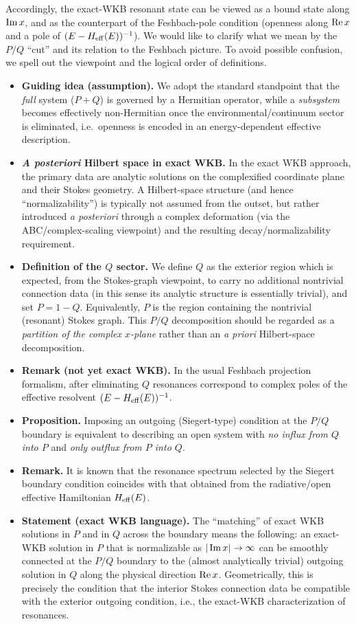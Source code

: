 Accordingly, the exact-WKB resonant state can be viewed as a bound state along $\operatorname{Im} x$, and as the counterpart of the Feshbach-pole condition (openness along $\operatorname{Re} x$ and a pole of $(E-H_{\mathrm{eff}}(E))^{-1}$).
%
We would like to clarify what we mean by the $P/Q$ ``cut'' and its relation to the Feshbach picture.
To avoid possible confusion, we spell out the viewpoint and the logical order of definitions.
\begin{itemize}
  \item \textbf{Guiding idea (assumption).}
  We adopt the standard standpoint that the \textit{full} system ($P+Q$) is governed by a Hermitian operator,
  while a \textit{subsystem} becomes effectively non-Hermitian once the environmental/continuum sector is eliminated,
  i.e.\ openness is encoded in an energy-dependent effective description.
  \item \textbf{\textit{A posteriori} Hilbert space in exact WKB.}
  In the exact WKB approach, the primary data are analytic solutions on the complexified coordinate plane and their Stokes geometry.
  A Hilbert-space structure (and hence ``normalizability'') is typically not assumed from the outset, but rather introduced \textit{a posteriori} through a complex deformation (via the ABC/complex-scaling viewpoint) and the resulting decay/normalizability requirement.
  \item \textbf{Definition of the $Q$ sector.}
  We define $Q$ as the exterior region which is expected, from the Stokes-graph viewpoint, to carry no additional nontrivial connection data (in this sense its analytic structure is essentially trivial), and set $P=1-Q$.
  Equivalently, $P$ is the region containing the nontrivial (resonant) Stokes graph.
  This $P/Q$ decomposition should be regarded as a \textit{partition of the complex $x$-plane} rather than an \textit{a priori} Hilbert-space decomposition.
  \item \textbf{Remark (not yet exact WKB).}
  In the usual Feshbach projection formalism, after eliminating $Q$ resonances correspond to complex poles of the effective resolvent $(E-H_{\mathrm{eff}}(E))^{-1}$.
  \item \textbf{Proposition.}
  Imposing an outgoing (Siegert-type) condition at the $P/Q$ boundary is equivalent to describing an open system with \textit{no influx from $Q$ into $P$} and \textit{only outflux from $P$ into $Q$}.
  \item \textbf{Remark.}
  It is known that the resonance spectrum selected by the Siegert boundary condition coincides with that obtained from the radiative/open effective Hamiltonian $H_{\mathrm{eff}}(E)$.
  \item \textbf{Statement (exact WKB language).}
  The ``matching'' of exact WKB solutions in $P$ and in $Q$ across the boundary means the following:
  an exact-WKB solution in $P$ that is normalizable as $|\operatorname{Im} x|\to\infty$ can be smoothly connected at the $P/Q$ boundary to the (almost analytically trivial) outgoing solution in $Q$ along the physical direction $\operatorname{Re} x$.
  Geometrically, this is precisely the condition that the interior Stokes connection data be compatible with the exterior outgoing condition, i.e., the exact-WKB characterization of resonances.
\end{itemize}
